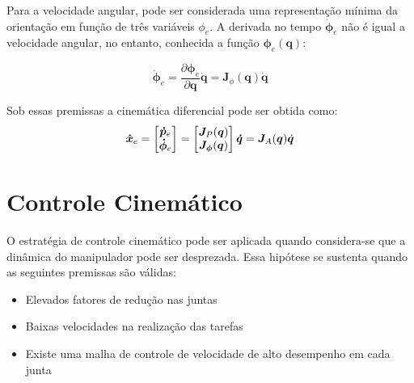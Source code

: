 Para a velocidade angular, pode ser considerada uma representação mínima da orientação em função de três variáveis $\phi_e$. 
A derivada no tempo $\dot{\bm{\phi}}_e$ não é igual a velocidade angular, no entanto, conhecida a função $\bm{\phi}_e(\bm{q})$:

\begin{equation} \label{eq:jacob_or}
\dot{\bm{\phi}}_e = \frac{\partial \bm{\phi}_e}{\partial \bm{q}} \bm{\dot{q}} = \bm{J}_{\phi}(\bm{q})\bm{\dot{q}}
\end{equation}

Sob essas premissas a cinemática diferencial pode ser obtida como:
\begin{equation} \label{eq:jacoba}
\bm{\dot{x}}_e = \begin{bmatrix}\bm{\dot{p}}_e \\ \bm{\dot{\phi}}_e\end{bmatrix} = \begin{bmatrix}\bm{J}_P(\bm{q}) \\ \bm{J_\phi}(\bm{q})\end{bmatrix} \bm{\dot{q}} = \bm{J}_A (\bm{q}) \dot{\bm{q}}
\end{equation}

 
\section{Controle Cinemático}
\label{sec:controle_cinematico}
O estratégia de controle cinemático pode ser aplicada quando considera-se que a dinâmica do manipulador pode ser desprezada. Essa hipótese se sustenta quando as seguintes premissas são válidas:
\begin{itemize}
\item Elevados fatores de redução nas juntas
\item Baixas velocidades na realização das tarefas
\item Existe uma malha de controle de velocidade de alto desempenho em cada junta
\end{itemize}

